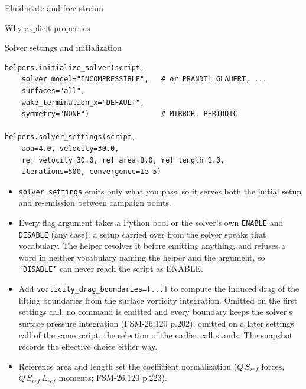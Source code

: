 \documentclass[aspectratio=169,10pt]{beamer}
\newcommand{\code}[1]{\texttt{\small #1}}
\begin{document}
\begin{frame}{Fluid state and free stream}
\begin{alertblock}{Why explicit properties}
  \end{alertblock}
\end{frame}

\begin{frame}{Solver settings and initialization}
\begin{lstlisting}
helpers.initialize_solver(script,
    solver_model="INCOMPRESSIBLE",   # or PRANDTL_GLAUERT, ...
    surfaces="all",
    wake_termination_x="DEFAULT",
    symmetry="NONE")                 # MIRROR, PERIODIC

helpers.solver_settings(script,
    aoa=4.0, velocity=30.0,
    ref_velocity=30.0, ref_area=8.0, ref_length=1.0,
    iterations=500, convergence=1e-5)
\end{lstlisting}
  \begin{itemize}
    \item \code{solver\_settings} emits only what you pass, so it serves both the initial setup and re-emission between campaign points.
    \item Every flag argument takes a Python bool or the solver's own \code{ENABLE} and \code{DISABLE} (any case): a setup carried over from the solver speaks that vocabulary. The helper resolves it before emitting anything, and refuses a word in neither vocabulary naming the helper and the argument, so \code{'DISABLE'} can never reach the script as ENABLE.
    \item Add \code{vorticity\_drag\_boundaries=[...]} to compute the induced drag of the lifting boundaries from the surface vorticity integration. Omitted on the first settings call, no command is emitted and every boundary keeps the solver's surface pressure integration (FSM-26.120 p.202); omitted on a later settings call of the same script, the selection of the earlier call stands. The snapshot records the effective choice either way.
    \item Reference area and length set the coefficient normalization ($Q\,S_{ref}$ forces, $Q\,S_{ref}\,L_{ref}$ moments; FSM-26.120 p.223).
  \end{itemize}
\end{frame}
\end{document}
